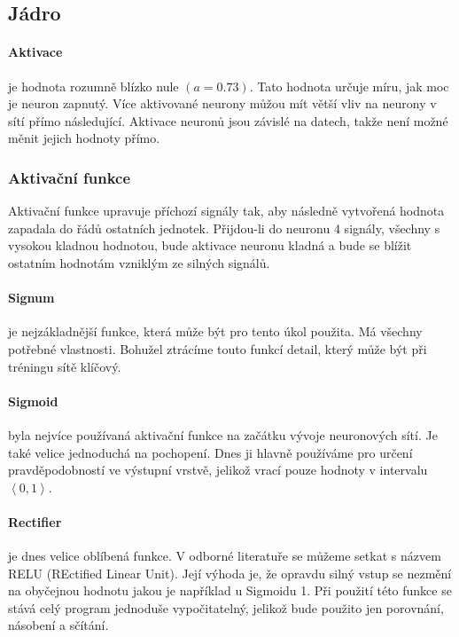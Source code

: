 \documentclass[12pt,a4paper]{report}
\begin{document}
	\subsection{Jádro}
		\paragraph{Aktivace}
		je hodnota rozumně blízko nule $(a=0.73)$. Tato hodnota určuje míru, jak moc je neuron zapnutý. Více aktivované neurony můžou mít větší vliv na neurony v sítí přímo následující. Aktivace neuronů jsou závislé na datech, takže není možné měnit jejich hodnoty přímo.
		\subsubsection{Aktivační funkce}
		Aktivační funkce upravuje příchozí signály tak, aby následně vytvořená hodnota zapadala do řádů ostatních jednotek. Přijdou-li do neuronu 4 signály, všechny s vysokou kladnou hodnotou, bude aktivace neuronu kladná a bude se blížit ostatním hodnotám vzniklým ze silných signálů.
		\paragraph{Signum}
		je nejzákladnější funkce, která může být pro tento úkol použita. Má všechny potřebné vlastnosti. Bohužel ztrácíme touto funkcí detail, který může být při tréningu sítě klíčový.
		\paragraph{Sigmoid}
		byla nejvíce používaná aktivační funkce na začátku vývoje neuronových sítí. Je také velice jednoduchá na pochopení. Dnes ji hlavně používáme pro určení pravděpodobností ve výstupní vrstvě, jelikož vrací pouze hodnoty v intervalu $\left<0,1\right>$.
		\paragraph{Rectifier}
		je dnes velice oblíbená funkce. V odborné literatuře se můžeme setkat s názvem RELU (REctified Linear Unit). Její výhoda je, že opravdu silný vstup se nezmění na obyčejnou hodnotu jakou je například u Sigmoidu 1. Při použití této funkce se stává celý program jednoduše vypočitatelný, jelikož bude použito jen porovnání, násobení a sčítání.
\end{document}

